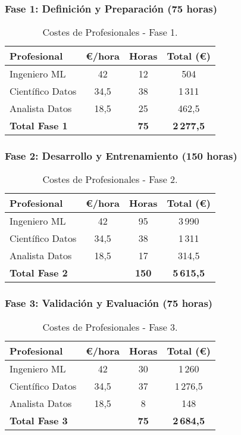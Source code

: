\subsubsection*{Fase 1: Definición y Preparación (75 horas)}
\begin{table}[H]
\centering
\begin{tabular}{|l|c|c|c|}
\toprule
Profesional & €/hora & Horas & Total (€) \\
\midrule
Ingeniero ML & 42 & 12 & 504 \\
Científico Datos & 34,5 & 38 & 1\,311 \\
Analista Datos & 18,5 & 25 & 462,5 \\
\midrule
\textbf{Total Fase 1} & & \textbf{75} & \textbf{2\,277,5} \\
\bottomrule
\end{tabular}
\caption{Costes de Profesionales - Fase 1.}
\label{tab:costes_fase1}
\end{table}


\subsubsection*{Fase 2: Desarrollo y Entrenamiento (150 horas)}
\begin{table}[H]
\centering
\begin{tabular}{|l|c|c|c|}
\toprule
Profesional & €/hora & Horas & Total (€) \\
\midrule
Ingeniero ML & 42 & 95 & 3\,990 \\
Científico Datos & 34,5 & 38 & 1\,311 \\
Analista Datos & 18,5 & 17 & 314,5 \\
\midrule
\textbf{Total Fase 2} & & \textbf{150} & \textbf{5\,615,5} \\
\bottomrule
\end{tabular}
\caption{Costes de Profesionales - Fase 2.}
\label{tab:costes_fase2}
\end{table}


\subsubsection*{Fase 3: Validación y Evaluación (75 horas)}
\begin{table}[H]
\centering
\begin{tabular}{|l|c|c|c|}
\toprule
Profesional & €/hora & Horas & Total (€) \\
\midrule
Ingeniero ML & 42 & 30 & 1\,260 \\
Científico Datos & 34,5 & 37 & 1\,276,5 \\
Analista Datos & 18,5 & 8 & 148 \\
\midrule
\textbf{Total Fase 3} & & \textbf{75} & \textbf{2\,684,5} \\
\bottomrule
\end{tabular}
\caption{Costes de Profesionales - Fase 3.}
\label{tab:costes_fase3}
\end{table}

